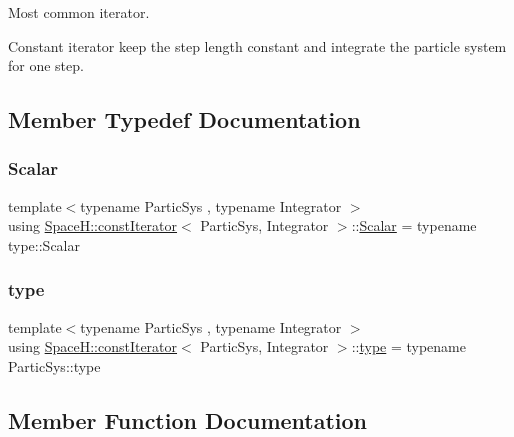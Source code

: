 Most common iterator. 

Constant iterator keep the step length constant and integrate the particle system for one step. 

\subsection{Member Typedef Documentation}
\mbox{\label{class_space_h_1_1const_iterator_aa8e66385a5d8eeb2a8dc98a2e1c2dbdd}} 
\subsubsection{\texorpdfstring{Scalar}{Scalar}}
{\footnotesize\ttfamily template$<$typename Partic\+Sys , typename Integrator $>$ \\
using \mbox{\hyperlink{class_space_h_1_1const_iterator}{Space\+H\+::const\+Iterator}}$<$ Partic\+Sys, Integrator $>$\+::\mbox{\hyperlink{class_space_h_1_1const_iterator_aa8e66385a5d8eeb2a8dc98a2e1c2dbdd}{Scalar}} =  typename type\+::\+Scalar}

\mbox{\label{class_space_h_1_1const_iterator_a2a6ca617f92a243149efe6027f1ffea2}} 
\subsubsection{\texorpdfstring{type}{type}}
{\footnotesize\ttfamily template$<$typename Partic\+Sys , typename Integrator $>$ \\
using \mbox{\hyperlink{class_space_h_1_1const_iterator}{Space\+H\+::const\+Iterator}}$<$ Partic\+Sys, Integrator $>$\+::\mbox{\hyperlink{class_space_h_1_1const_iterator_a2a6ca617f92a243149efe6027f1ffea2}{type}} =  typename Partic\+Sys\+::type}



\subsection{Member Function Documentation}
\mbox{\label{class_space_h_1_1const_iterator_a75d21d7e7427f6c667cd9fc954e99cc6}} 

